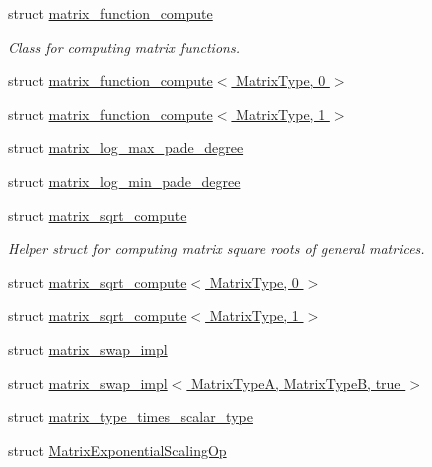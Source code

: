 \begin{DoxyCompactItemize}
\item 
struct \hyperlink{struct_eigen_1_1internal_1_1matrix__function__compute}{matrix\+\_\+function\+\_\+compute}
\begin{DoxyCompactList}\small\item\em Class for computing matrix functions. \end{DoxyCompactList}\item 
struct \hyperlink{struct_eigen_1_1internal_1_1matrix__function__compute_3_01_matrix_type_00_010_01_4}{matrix\+\_\+function\+\_\+compute$<$ Matrix\+Type, 0 $>$}
\item 
struct \hyperlink{struct_eigen_1_1internal_1_1matrix__function__compute_3_01_matrix_type_00_011_01_4}{matrix\+\_\+function\+\_\+compute$<$ Matrix\+Type, 1 $>$}
\item 
struct \hyperlink{struct_eigen_1_1internal_1_1matrix__log__max__pade__degree}{matrix\+\_\+log\+\_\+max\+\_\+pade\+\_\+degree}
\item 
struct \hyperlink{struct_eigen_1_1internal_1_1matrix__log__min__pade__degree}{matrix\+\_\+log\+\_\+min\+\_\+pade\+\_\+degree}
\item 
struct \hyperlink{struct_eigen_1_1internal_1_1matrix__sqrt__compute}{matrix\+\_\+sqrt\+\_\+compute}
\begin{DoxyCompactList}\small\item\em Helper struct for computing matrix square roots of general matrices. \end{DoxyCompactList}\item 
struct \hyperlink{struct_eigen_1_1internal_1_1matrix__sqrt__compute_3_01_matrix_type_00_010_01_4}{matrix\+\_\+sqrt\+\_\+compute$<$ Matrix\+Type, 0 $>$}
\item 
struct \hyperlink{struct_eigen_1_1internal_1_1matrix__sqrt__compute_3_01_matrix_type_00_011_01_4}{matrix\+\_\+sqrt\+\_\+compute$<$ Matrix\+Type, 1 $>$}
\item 
struct \hyperlink{struct_eigen_1_1internal_1_1matrix__swap__impl}{matrix\+\_\+swap\+\_\+impl}
\item 
struct \hyperlink{struct_eigen_1_1internal_1_1matrix__swap__impl_3_01_matrix_type_a_00_01_matrix_type_b_00_01true_01_4}{matrix\+\_\+swap\+\_\+impl$<$ Matrix\+Type\+A, Matrix\+Type\+B, true $>$}
\item 
struct \hyperlink{struct_eigen_1_1internal_1_1matrix__type__times__scalar__type}{matrix\+\_\+type\+\_\+times\+\_\+scalar\+\_\+type}
\item 
struct \hyperlink{struct_eigen_1_1internal_1_1_matrix_exponential_scaling_op}{Matrix\+Exponential\+Scaling\+Op}

\end{DoxyCompactItemize}
